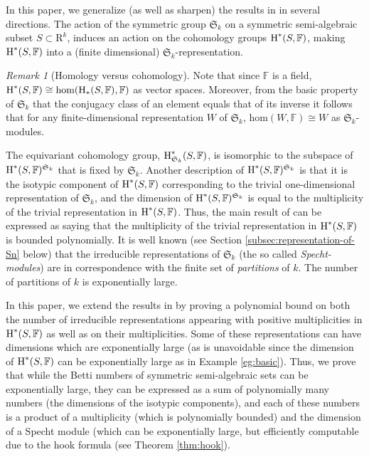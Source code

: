 \documentclass{amsart}
\theoremstyle{definition}
\theoremstyle{remark}
\newtheorem{remark}{Remark}
\numberwithin{equation}{section}
\begin{document}
In this paper, we generalize (as well as sharpen) the results in \cite{BC2013} in several directions. 
The action of the symmetric group $\mathfrak{S}_k$ on a symmetric semi-algebraic subset 
$S \subset {\mathrm{R}}^k$,  induces an action on the cohomology groups ${\mbox{\rm H}}^*(S,{\mathbb{F}})$, making 
${\mbox{\rm H}}^*(S,{\mathbb{F}})$ into a (finite dimensional) $\mathfrak{S}_k$-representation. 

\begin{remark}[Homology versus cohomology]
\label{rem:homology}
Note that since ${\mathbb{F}}$ is a field, ${\mbox{\rm H}}^*(S,{\mathbb{F}}) \cong {\textrm{hom}}({\mbox{\rm H}}_*(S,{\mathbb{F}}),{\mathbb{F}})$ as vector spaces.
Moreover, from the basic property of $\mathfrak{S}_k$ that the conjugacy class of an element equals that of its inverse it follows that for any finite-dimensional representation $W$ of $\mathfrak{S}_k$, ${\textrm{hom}}(W,{\mathbb{F}}) \cong W$ as $\mathfrak{S}_k$-modules.
{}
\end{remark}

The equivariant
cohomology group, ${\mbox{\rm H}}^*_{\mathfrak{S}_k}(S,{\mathbb{F}})$, is isomorphic to the subspace of
${\mbox{\rm H}}^*(S,{\mathbb{F}})^{\mathfrak{S}_k}$ that is fixed by $\mathfrak{S}_k$. Another description of   ${\mbox{\rm H}}^*(S,{\mathbb{F}})^{\mathfrak{S}_k}$ is that it  is the isotypic component of ${\mbox{\rm H}}^*
(S,{\mathbb{F}})$ corresponding to the trivial one-dimensional representation of $\mathfrak{S}_k$, and the
dimension of ${\mbox{\rm H}}^*(S,{\mathbb{F}})^{\mathfrak{S}_k}$ is equal to the multiplicity of the trivial representation
in ${\mbox{\rm H}}^*(S,{\mathbb{F}})$. Thus, the main result of \cite{BC2013} can be expressed as saying that the multiplicity of the trivial representation in   ${\mbox{\rm H}}^*(S,{\mathbb{F}})$ is bounded polynomially. It is well known
(see Section \ref{subsec:representation-of-Sn} below) that the irreducible representations of $\mathfrak{S}_k$ (the so called 
\emph{Specht-modules}) are in correspondence with the finite set of \emph{partitions} of $k$. The number of partitions of $k$ is exponentially large. 

In this paper, we extend the results in 
\cite{BC2013} by proving a polynomial bound on both the number of irreducible representations
appearing with positive multiplicities in ${\mbox{\rm H}}^*(S,{\mathbb{F}})$ as well as on their multiplicities. Some of these
representations can have dimensions which are exponentially large (as is unavoidable since the 
dimension of ${\mbox{\rm H}}^*(S,{\mathbb{F}})$ can be exponentially large as in Example \ref{eg:basic}). 
Thus, we prove that
while the Betti numbers of symmetric semi-algebraic sets can be exponentially large, they can be expressed as a sum of polynomially many numbers (the dimensions of the isotypic components),
and each of these numbers is a product of a multiplicity (which is polynomially bounded) and the
dimension of a Specht module (which can be exponentially large, but efficiently computable due to the hook formula (see Theorem \ref{thm:hook}). 
\end{document}
